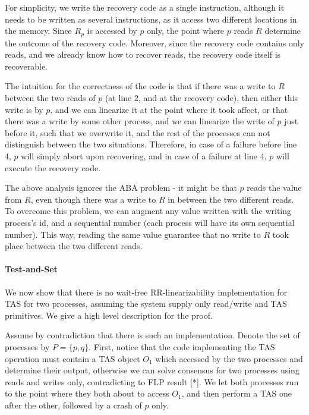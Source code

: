 \documentclass{article}
\begin{document}
For simplicity, we write the recovery code as a single instruction, although it needs to be written as several instructions, as it access two different locations in the memory. Since $R_p$ is accessed by $p$ only, the point where $p$ reads $R$ determine the outcome of the recovery code. Moreover, since the recovery code contains only reads, and we already know how to recover reads, the recovery code itself is recoverable.

The intuition for the correctness of the code is that if there was a write to $R$ between the two reads of $p$ (at line 2, and at the recovery code), then either this write is by $p$, and we can linearize it at the point where it took affect, or that there was a write by some other process, and we can linearize the write of $p$ just before it, such that we overwrite it, and the rest of the processes can not distinguish between the two situations. Therefore, in case of a failure before line 4, $p$ will simply abort upon recovering, and in case of a failure at line 4, $p$ will execute the recovery code.

The above analysis ignores the ABA problem - it might be that $p$ reads the value from $R$, even though there was a write to $R$ in between the two different reads. To overcome this problem, we can augment any value written with the writing process's id, and a sequential number (each process will have its own sequential number). This way, reading the same value guarantee that no write to $R$ took place between the two different reads.


\paragraph*{Test-and-Set}
We now show that there is no wait-free RR-linearizability implementation for TAS for two processes, assuming the system supply only read/write and TAS primitives. We give a high level description for the proof.

Assume by contradiction that there is such an implementation. Denote the set of processes by $P=\{p,q\}$. First, notice that the code implementing the TAS operation must contain a TAS object $O_1$ which accessed by the two processes and determine their output, otherwise we can solve consensus for two processes using reads and writes only, contradicting to FLP result [*]. We let both processes run to the point where they both about to access $O_1$, and then perform a TAS one after the other, followed by a crash of $p$ only.
\end{document}
